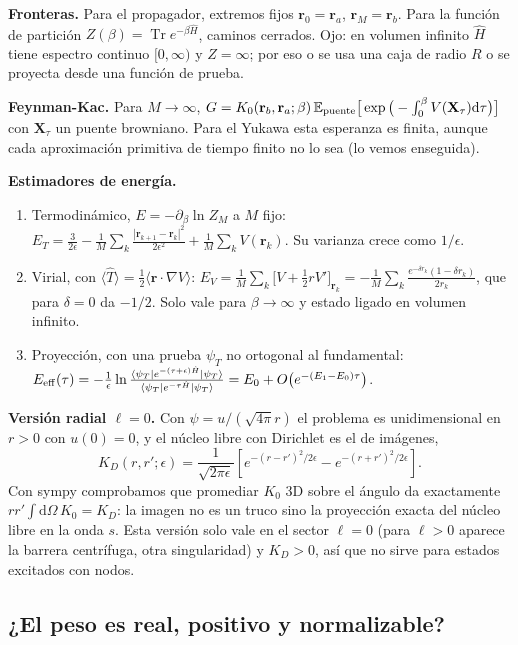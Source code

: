 \documentclass[11pt]{article}
\newcommand{\dd}{\mathrm{d}}
\newcommand{\Tr}{\operatorname{Tr}}
\begin{document}
\textbf{Fronteras.} Para el propagador, extremos fijos $\mathbf r_0=\mathbf r_a$, $\mathbf r_M=\mathbf r_b$. Para la función de partición $Z(\beta)=\Tr e^{-\beta\hat H}$, caminos cerrados. Ojo: en volumen infinito $\hat H$ tiene espectro continuo $[0,\infty)$ y $Z=\infty$; por eso o se usa una caja de radio $R$ o se proyecta desde una función de prueba.

\textbf{Feynman-Kac.} Para $M\to\infty$, $G=K_0(\mathbf r_b,\mathbf r_a;\beta)\,\mathbb E_{\rm puente}\big[\exp\big(-\int_0^\beta V(\mathbf X_\tau)\dd\tau\big)\big]$ con $\mathbf X_\tau$ un puente browniano. Para el Yukawa esta esperanza es finita, aunque cada aproximación primitiva de tiempo finito no lo sea (lo vemos enseguida).

\textbf{Estimadores de energía.}
\begin{enumerate}
\item Termodinámico, $E=-\partial_\beta\ln Z_M$ a $M$ fijo:
$E_T=\frac{3}{2\epsilon}-\frac{1}{M}\sum_k\frac{|\mathbf r_{k+1}-\mathbf r_k|^2}{2\epsilon^2}+\frac1M\sum_kV(\mathbf r_k)$. Su varianza crece como $1/\epsilon$.
\item Virial, con $\langle\hat T\rangle=\tfrac12\langle\mathbf r\cdot\nabla V\rangle$:
$E_V=\frac1M\sum_k\big[V+\tfrac12rV'\big]_{\mathbf r_k}=-\frac1M\sum_k\frac{e^{-\delta r_k}(1-\delta r_k)}{2r_k}$, que para $\delta=0$ da $-1/2$. Solo vale para $\beta\to\infty$ y estado ligado en volumen infinito.
\item Proyección, con una prueba $\psi_T$ no ortogonal al fundamental:
$E_{\rm eff}(\tau)=-\frac1\epsilon\ln\frac{\langle\psi_T|e^{-(\tau+\epsilon)\hat H}|\psi_T\rangle}{\langle\psi_T|e^{-\tau\hat H}|\psi_T\rangle}=E_0+O\big(e^{-(E_1-E_0)\tau}\big)$.
\end{enumerate}

\textbf{Versión radial $\ell=0$.} Con $\psi=u/(\sqrt{4\pi}r)$ el problema es unidimensional en $r>0$ con $u(0)=0$, y el núcleo libre con Dirichlet es el de imágenes,
\[
K_D(r,r';\epsilon)=\frac{1}{\sqrt{2\pi\epsilon}}\left[e^{-(r-r')^2/2\epsilon}-e^{-(r+r')^2/2\epsilon}\right].
\]
Con sympy comprobamos que promediar $K_0$ 3D sobre el ángulo da exactamente $rr'\int\dd\Omega\,K_0=K_D$: la imagen no es un truco sino la proyección exacta del núcleo libre en la onda $s$. Esta versión solo vale en el sector $\ell=0$ (para $\ell>0$ aparece la barrera centrífuga, otra singularidad) y $K_D>0$, así que no sirve para estados excitados con nodos.

\subsection{¿El peso es real, positivo y normalizable?}
\label{sec:peso}
\end{document}
